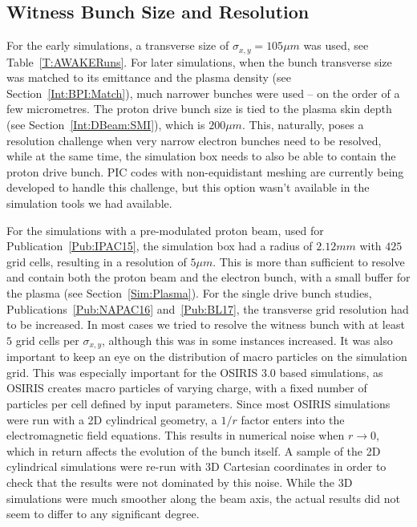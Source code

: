 \subsection{Witness Bunch Size and Resolution}
\label{Sim:EBeam:SizeRes}

For the early simulations, a transverse size of $\sigma_{x,y}=105\unit{\mu m}$ was used, see Table~\ref{T:AWAKERuns}.
For later simulations, when the bunch transverse size was matched to its emittance and the plasma density (see Section~\ref{Int:BPI:Match}), much narrower bunches were used -- on the order of a few micrometres.
The proton drive bunch size is tied to the plasma skin depth (see Section~\ref{Int:DBeam:SMI}), which is $200\unit{\mu m}$.
This, naturally, poses a resolution challenge when very narrow electron bunches need to be resolved, while at the same time, the simulation box needs to also be able to contain the proton drive bunch.
PIC codes with non-equidistant meshing are currently being developed to handle this challenge, but this option wasn't available in the simulation tools we had available.

For the simulations with a pre-modulated proton beam, used for Publication~\ref{Pub:IPAC15}, the simulation box had a radius of $2.12\unit{mm}$ with $425$ grid cells, resulting in a resolution of $5\unit{\mu m}$.
This is more than sufficient to resolve and contain both the proton beam and the electron bunch, with a small buffer for the plasma (see Section~\ref{Sim:Plasma}).
For the single drive bunch studies, Publications~\ref{Pub:NAPAC16} and~\ref{Pub:BL17}, the transverse grid resolution had to be increased.
In most cases we tried to resolve the witness bunch with at least $5$ grid cells per $\sigma_{x,y}$, although this was in some instances increased.
It was also important to keep an eye on the distribution of macro particles on the simulation grid.
This was especially important for the OSIRIS 3.0 based simulations, as OSIRIS creates macro particles of varying charge, with a fixed number of particles per cell defined by input parameters.
Since most OSIRIS simulations were run with a 2D cylindrical geometry, a $1/r$ factor enters into the electromagnetic field equations.
This results in numerical noise when $r \to 0$, which in return affects the evolution of the bunch itself.
A sample of the 2D cylindrical simulations were re-run with 3D Cartesian coordinates in order to check that the results were not dominated by this noise.
While the 3D simulations were much smoother along the beam axis, the actual results did not seem to differ to any significant degree.

